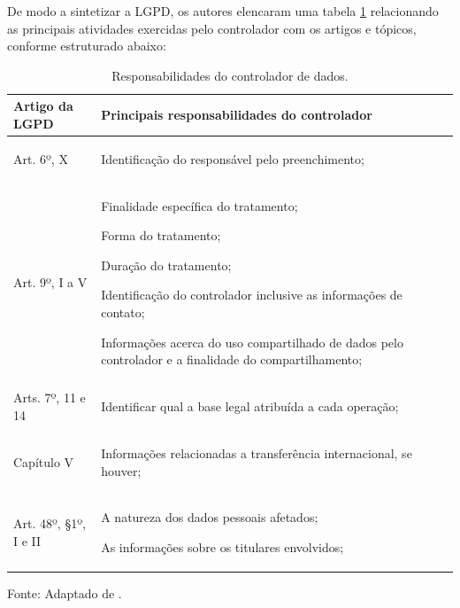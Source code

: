 \documentclass[
	12pt,				%
	openright,			%
	oneside,			%
	a4paper,			%
	english,			%
	french,				%
	spanish,			%
	brazil,				%
	]{abntex2}
\begin{document}
De modo a sintetizar a LGPD, os autores  elencaram uma tabela \ref{tab: responsabilidades do controlador} relacionando as principais atividades exercidas pelo controlador com os artigos e tópicos, conforme estruturado abaixo:

\begin{table}[ht]
    \centering
    \caption{ Responsabilidades do controlador de dados.}
    \label{tab: responsabilidades do controlador}
    \begin{tabular}{|p{4 cm}|p{11.5cm}|p{0cm}|} 
        \hline

        \textbf{Artigo da LGPD} & \textbf{Principais responsabilidades do controlador}  \\ \hline

Art. 6º, X
&
\begin{tabitemize}
\item Identificação do responsável pelo preenchimento;
\end{tabitemize}\\ \hline
Art. 9º, I a V
&
\begin{tabitemize}
\item Finalidade específica do tratamento;
\item Forma do tratamento;
\item Duração do tratamento;
\item Identificação do controlador inclusive as informações de contato;
\item Informações acerca do uso compartilhado de dados pelo controlador e a finalidade do compartilhamento;
\end{tabitemize} \\ \hline
Arts. 7º, 11 e 14
&
\begin{tabitemize}
\item Identificar qual a base legal atribuída a cada operação;
\end{tabitemize}\\ \hline

Capítulo V
&
\begin{tabitemize}
\item Informações relacionadas a transferência internacional, se houver;
\end{tabitemize}\\ \hline

Art. 48º, §1º, I e II
&
\begin{tabitemize}
\item A natureza dos dados pessoais afetados;
\item As informações sobre os titulares envolvidos;
\end{tabitemize}\\ \hline

 
    \end{tabular}
    \newline \newline Fonte: Adaptado de .
\end{table}
\end{document}
